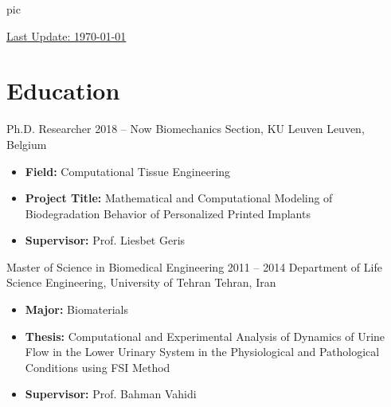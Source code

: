 \documentclass{cv}
\begin{document}
{{pic}}


\noindent
{\footnotesize  \underline{Last Update: \today{}}}





\section{Education}

\longdatedsubsection
{Ph.D. Researcher}
{2018 -- Now} 
{Biomechanics Section, KU Leuven} 
{Leuven, Belgium} 

\begin{itemize}

\item 
\textbf{Field:} Computational Tissue Engineering

\item
\textbf{Project Title:} Mathematical and Computational Modeling of Biodegradation Behavior of Personalized Printed Implants

\item
\textbf{Supervisor:} Prof. Liesbet Geris

\end{itemize}

\longdatedsubsection
{Master of Science in Biomedical Engineering}
{2011 -- 2014} 
{Department of Life Science Engineering, University of Tehran} 
{Tehran, Iran} 

\begin{itemize}

\item 
\textbf{Major:} Biomaterials

\item
\textbf{Thesis:} Computational and Experimental Analysis of Dynamics of Urine Flow in the Lower Urinary System in the Physiological and Pathological Conditions using FSI Method

\item
\textbf{Supervisor:} Prof. Bahman Vahidi


\end{itemize}
\end{document}
